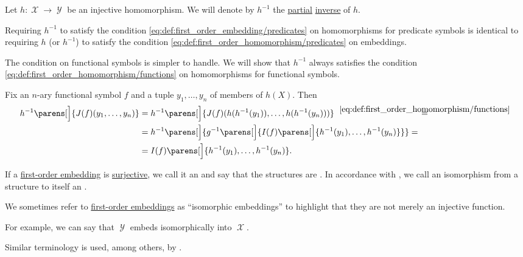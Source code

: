 \begin{defproof}
  Let \( h: \mscrX \to \mscrY \) be an injective homomorphism. We will denote by \( h^{-1} \) the \hyperref[def:set_valued_map/partial]{partial} \hyperref[def:set_valued_map/inverse]{inverse} of \( h \).

  Requiring \( h^{-1} \) to satisfy the condition \eqref{eq:def:first_order_embedding/predicates} on homomorphisms for predicate symbols is identical to requiring \( h \) (or \( h^{-1} \)) to satisfy the condition \eqref{eq:def:first_order_homomorphism/predicates} on embeddings.

  The condition on functional symbols is simpler to handle. We will show that \( h^{-1} \) always satisfies the condition \eqref{eq:def:first_order_homomorphism/functions} on homomorphisms for functional symbols.

  Fix an \( n \)-ary functional symbol \( f \) and a tuple \( y_1, \ldots, y_n \) of members of \( h(X) \). Then
  \begin{align*}
    h^{-1}\parens[\Big]{ J(f)(y_1, \ldots, y_n) }
    &=
    h^{-1}\parens[\Big]{ J(f)(h(h^{-1}(y_1)), \ldots, h(h^{-1}(y_n))) }
    \reloset {\eqref{eq:def:first_order_homomorphism/functions}} = \\ &=
    h^{-1}\parens[\Big]{ g^{-1}\parens[\Big]{ I(f) \parens[\Big]{ h^{-1}(y_1), \ldots, h^{-1}(y_n) } } }
    = \\ &=
    I(f) \parens[\Big]{ h^{-1}(y_1), \ldots, h^{-1}(y_n) }.
  \end{align*}
\end{defproof}

\begin{definition}\label{def:first_order_isomorphism}
  If a \hyperref[def:first_order_embedding]{first-order embedding} is \hyperref[def:function_invertibility/surjective]{surjective}, we call it an  and say that the structures are . In accordance with , we call an isomorphism from a structure to itself an .
\end{definition}

\begin{remark}\label{rem:embeds_isomorphically}
  We sometimes refer to \hyperref[def:first_order_embedding]{first-order embeddings} as \enquote{isomorphic embeddings} to highlight that they are not merely an injective function.

  For example, we can say that \( \mscrY \) embeds isomorphically into \( \mscrX \).

  Similar terminology is used, among others, by .
\end{remark}

